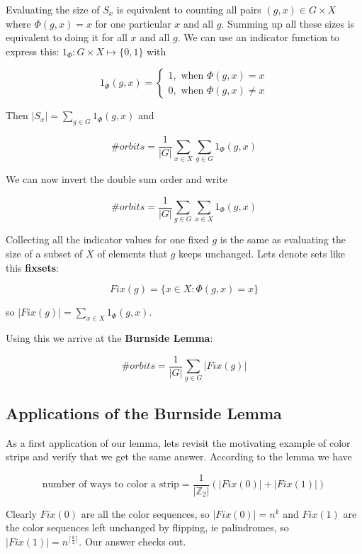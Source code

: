 Evaluating the size of $S_x$ is equivalent to counting all pairs $(g,x) \in G \times X$ where $\Phi(g, x) = x$ for one particular $x$ and all $g$. Summing up all these sizes is equivalent to doing it for all $x$ and all $g$. We can use an indicator function to express this: $1_\Phi: G \times X \mapsto \{0,1\}$ with

$$
1_\Phi(g, x) = 
\begin{cases}
1, \text{ when } \Phi(g, x) = x\\
0, \text{ when } \Phi(g, x) \neq x
\end{cases}
$$

Then $|S_x| = \sum_{g \in G} 1_\Phi (g, x)$ and 

$$
\#orbits = \frac{1}{|G|} \sum_{x \in X} \sum_{g \in G} 1_\Phi (g, x)
$$

We can now invert the double sum order and write

$$
\#orbits = \frac{1}{|G|} \sum_{g \in G} \sum_{x \in X} 1_\Phi (g, x)
$$

Collecting all the indicator values for one fixed $g$ is the same as evaluating the size of a subset of $X$ of elements that $g$ keeps unchanged. Lets denote sets like this \textbf{fixsets}:

$$
Fix(g) = \{x \in X:  \Phi(g, x) = x\}
$$

so $|Fix(g)| = \sum_{x \in X} 1_\Phi (g, x)$.

Using this we arrive at the \textbf{Burnside Lemma}:

$$
\#orbits = \frac{1}{|G|} \sum_{g \in G} |Fix(g)|
$$

\subsection{Applications of the Burnside Lemma}

As a first application of our lemma, lets revisit the motivating example of color strips and verify that we get the same answer. According to the lemma we have

$$
\text{number of ways to color a strip} = \frac{1}{|\mathbb{Z}_2|} (|Fix(0)| + |Fix(1)|)
$$

Clearly $Fix(0)$ are all the color sequences, so $|Fix(0)| = n^k$ and $Fix(1)$ are the color sequences left unchanged by flipping, ie palindromes, so $|Fix(1)| = n^{\lceil \frac{k}{2} \rceil}$. Our answer checks out.

